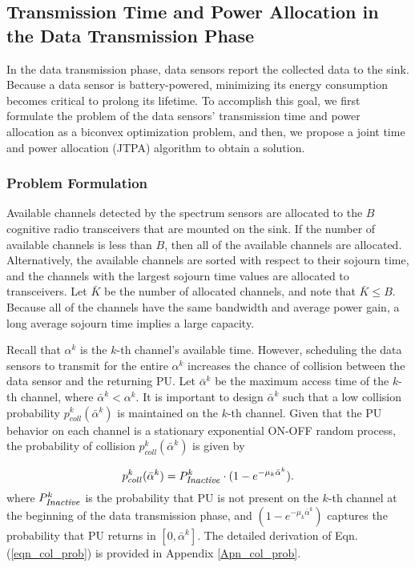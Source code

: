 \documentclass[journal]{IEEEtran} \ifCLASSINFOpdf
\begin{document}
\subsection{Transmission Time and Power Allocation in the Data Transmission Phase}
\label{sec:data_transmission}
In the data transmission phase, data sensors report the collected data to the sink. Because a data sensor is battery-powered, minimizing its energy consumption becomes critical to prolong its lifetime. To accomplish this goal, we first formulate the problem of the data sensors' transmission time and power allocation as a biconvex optimization problem, and then, we propose a joint time and power allocation (JTPA) algorithm to obtain a solution.
\subsubsection{Problem Formulation}
Available channels detected by the spectrum sensors are allocated to the $B$ cognitive radio transceivers that are mounted on the sink. If the number of available channels is less than $B$, then all of the available channels are allocated. Alternatively, the available channels are sorted with respect to their sojourn time, and the channels with the largest sojourn time values are allocated to transceivers. Let $\bar{K}$ be the number of allocated channels, and note that $\bar{K} \leq B$. Because all of the channels have the same bandwidth and average power gain, a long average sojourn time implies a large capacity.

Recall that $\alpha^k$ is the $k$-th channel's available time. However, scheduling the data sensors to transmit for the entire $\alpha^k$ increases the chance of collision between the data sensor and the returning PU. Let $\bar{\alpha}^{k}$ be the maximum access time of the $k$-th channel, where $\bar{\alpha}^{k} < \alpha^k$. It is important to design $\bar{\alpha}^{k}$ such that a low collision probability $p_{coll}^k(\bar{\alpha}^{k})$ is maintained on the $k$-th channel. Given that the PU behavior on each channel is a stationary exponential ON-OFF random process, the probability of collision $p_{coll}^k(\bar{\alpha}^{k})$ is given by \cite{Kim2008}

\begin{equation} \label{eqn_col_prob}
p_{coll}^k(\bar{\alpha}^{k}) = P_{\mbox{\footnotesize \textit{Inactive}}}^k \cdot (1-e^{-\mu_k \bar{\alpha}^{k}}).
\end{equation}
where $P_{\mbox{\footnotesize \textit{Inactive}}}^k$ is the probability that PU is not present on the $k$-th channel at the beginning of the data transmission phase, and $(1-e^{-\mu_k \bar{\alpha}^{k}})$ captures the probability that PU returns in $[0, \bar{\alpha}^{k}]$. The detailed derivation of Eqn. (\ref{eqn_col_prob}) is provided in Appendix \ref{Apn_col_prob}.
\end{document}
